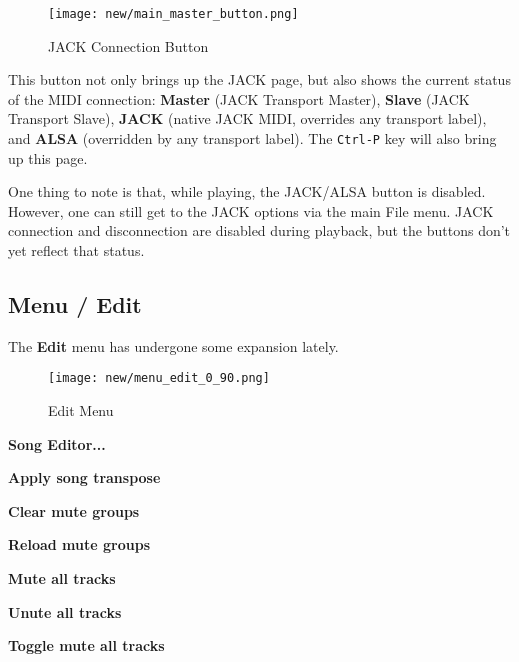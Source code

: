 \begin{figure}[H]
   \centering 
   \texttt{[image: new/main\_master\_button.png]}
   \caption{JACK Connection Button}
   \label{fig:seq64_main_master_button}
\end{figure}

   This button not only brings up the JACK page, but also shows the current
   status of the MIDI connection:
   \textbf{Master} (JACK Transport Master),
   \textbf{Slave} (JACK Transport Slave),
   \textbf{JACK} (native JACK MIDI, overrides any transport label),
   and \textbf{ALSA} (overridden by any transport label).
   The \texttt{Ctrl-P} key will also bring up this page.

   One thing to note is that, while playing, the JACK/ALSA button is disabled.
   However, one can still get to the JACK options via the main File menu.
   JACK connection and disconnection are disabled during playback, but the
   buttons don't yet reflect that status.

\subsection{Menu / Edit}
\label{subsec:seq64_menu_edit}

   The \textbf{Edit} menu has undergone some expansion lately.

\begin{figure}[H]
   \centering 
   \texttt{[image: new/menu\_edit\_0\_90.png]}
   \caption{Edit Menu}
   \label{fig:seq64_menu_edit_0_90}
\end{figure}

   \begin{enumber}
      \item \textbf{Song Editor...}
      \item \textbf{Apply song transpose}
      \item \textbf{Clear mute groups}
      \item \textbf{Reload mute groups}
      \item \textbf{Mute all tracks}
      \item \textbf{Unute all tracks}
      \item \textbf{Toggle mute all tracks}
   \end{enumber}

   \setcounter{ItemCounter}{0}      %

